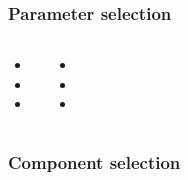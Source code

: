 \begin{frame}
	\frametitle{Parameter selection}
	
	\begin{columns}[c]
		
		
		\begin{itemize}
			\item 
			\item 
			\item 
		\end{itemize}
		
		
		\begin{itemize}
			\item 
			\item 
			\item 
		\end{itemize}	
		
	\end{columns}
	
\end{frame}

\begin{frame}
	\frametitle{Component selection}
	
	\begin{table}
		\centering
		\resizebox{\textwidth}{!}{}
	\end{table}
	
\end{frame}
